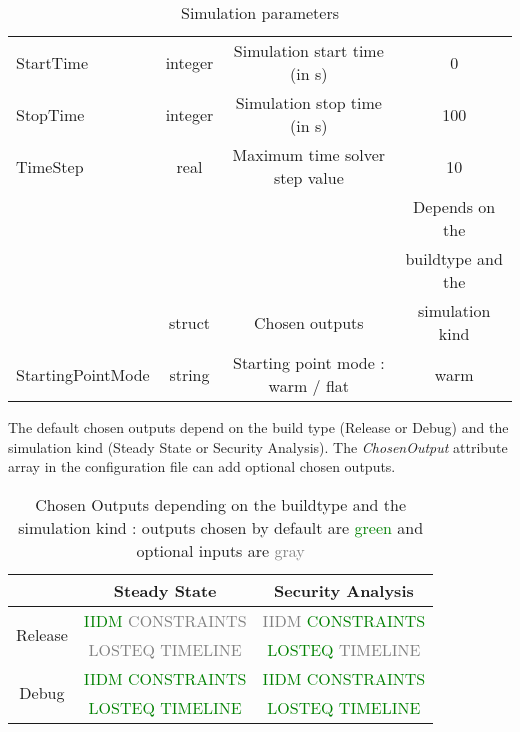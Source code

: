 \documentclass[a4paper, 12pt]{report}
\begin{document}
\begin{table}[H]
\begin{tabular}{ l | c | c | c }
\small{StartTime} & \small{integer} & \small{Simulation start time (in s)} & \small{0} \\
\rowcolor{gray!10}
\small{StopTime} & \small{integer} & \small{Simulation stop time (in s)} & \small{100} \\
\rowcolor{white}
\small{TimeStep} & \small{real} & \small{Maximum time solver step value} & \small{10} \\
\rowcolor{gray!10}
& & & \small{Depends on the} \\
\rowcolor{gray!10}
& & & \small{buildtype and the} \\
\rowcolor{gray!10}
\multirow{-3}{*}{\small{ChosenOutputs}} & \multirow{-3}{*}{\small{struct}}  & \multirow{-3}{*}{\small{Chosen outputs}} & \small{simulation kind} \\
\rowcolor{gray!10}
\small{StartingPointMode} & \small{string} & \small{Starting point mode : warm / flat} & \small{warm} \\
\bottomrule
\end{tabular}
\caption{Simulation parameters}
\end{table}

\begin{table}[H]
The default chosen outputs depend on the build type (Release or Debug) and the simulation kind (Steady State or Security Analysis). The \textit{ChosenOutput} attribute array in the configuration file can add optional chosen outputs.
\center
\begin{tabular}{| c | c | c |}
\cline{2-3}
\multicolumn{1}{c|}{} & Steady State & Security Analysis \\
\hline
\multirow{2}{*}{Release} & \textcolor{green}{\small{IIDM} \textcolor{gray}{CONSTRAINTS}} & \small{\textcolor{gray}{IIDM} \textcolor{green}{CONSTRAINTS}} \\
& \small{\textcolor{gray}{LOSTEQ}} \textcolor{gray}{TIMELINE} & \small{\textcolor{green}{LOSTEQ} \textcolor{gray}{TIMELINE}} \\
\hline
\multirow{2}{*}{Debug} & \textcolor{green}{\small{IIDM CONSTRAINTS}} & \textcolor{green}{\small{IIDM CONSTRAINTS}} \\
& \textcolor{green}{\small{LOSTEQ TIMELINE}} & \textcolor{green}{\small{LOSTEQ TIMELINE}} \\
\hline
\end{tabular}
\caption{Chosen Outputs depending on the buildtype and the simulation kind : outputs chosen by default are \textcolor{green}{green} and optional inputs are \textcolor{gray}{gray}}
\end{table}
\end{document}
